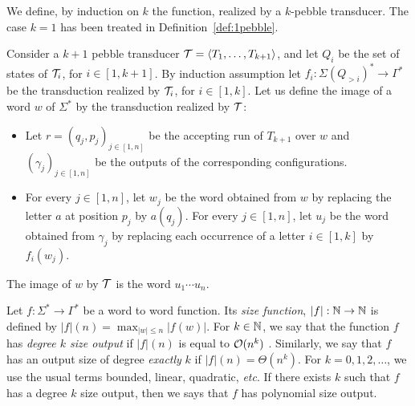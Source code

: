   \begin{definition}
We define, by induction on $k$ the function, realized by a $k$-pebble transducer. The case $k=1$ has been treated in Definition~\ref{def:1pebble}. 

Consider a $k+1$ pebble transducer ${\mathcal T}=\langle T_1,\ldots,T_{k+1} \rangle$, and let $Q_i$ be the set of states of ${\mathcal T}_i$, for $i\in [1,k+1]$. By induction assumption let $f_i:\Sigma(Q_{>i})^*\rightarrow \Gamma^*$ be the transduction realized by ${\mathcal T}_i$, for $i\in [1,k]$.
Let us define the image of a word $w$ of $\Sigma^*$ by the transduction realized by ${\mathcal T}$:
\begin{itemize}
  \item Let $r=(q_j,p_j)_{j\in[1, n]}$ be the accepting run of $T_{k+1}$ over $w$ and $(\gamma_j)_{j\in[1, n]}$ be the outputs of the corresponding configurations.
  
  \item  For every $j\in[1,n]$, let $w_j$ be the word obtained from $w$ by replacing the letter $a$ at position $p_j$ by $a(q_j)$.
      For every $j\in[1,n]$, let $u_j$ be the word obtained from $\gamma_j$ by replacing each occurrence of a letter $i\in [1,k]$ by $f_i(w_j)$.
  
  \end{itemize}
  The image of $w$ by ${\mathcal T}$ is the word $u_1\cdots u_n$.
\end{definition}


\begin{definition}
  Let $f:\Sigma^*\rightarrow \Gamma^*$ be a word to word function. Its \emph{size function}, $|f|:\mathbb{N}\rightarrow \mathbb{N}$ is defined by $|f|(n)=\max_{|w|\leq n}|f(w)|$. For $k\in \mathbb{N}$, we say that the function $f$ has \emph{degree $k$ size output} if $|f|(n)$ is equal to ${\mathcal O}(n^k)$ . Similarly, we say that $f$ has an output size of degree \emph{exactly} $k$ if $|f|(n)=\Theta(n^k)$. For $k=0,1,2,\ldots$, we use the usual terms bounded, linear, quadratic, \textit{etc}.
  If there exists $k$ such that $f$ has a degree $k$ size output, then we says that $f$ has polynomial size output.
  
\end{definition}

